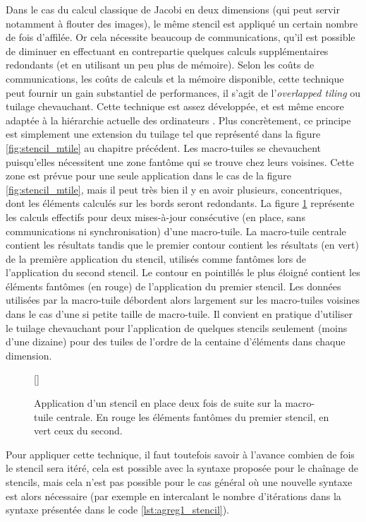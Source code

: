 Dans le cas du calcul classique de Jacobi en deux dimensions (qui peut servir notamment à flouter des images), le même stencil est appliqué un certain nombre de fois d'affilée. Or cela nécessite beaucoup de communications, qu'il est possible de diminuer en effectuant en contrepartie quelques calculs supplémentaires redondants (et en utilisant un peu plus de mémoire). Selon les coûts de communications, les coûts de calculs et la mémoire disponible, cette technique peut fournir un gain substantiel de performances, il s'agit de l'\emph{overlapped tiling} ou tuilage chevauchant. Cette technique est assez développée, et est même encore adaptée à la hiérarchie actuelle des ordinateurs \cite{Art17}. Plus concrètement, ce principe est simplement une extension du tuilage tel que représenté dans la figure \ref{fig:stencil_mtile} au chapitre précédent. Les macro-tuiles se chevauchent puisqu'elles nécessitent une zone fantôme qui se trouve chez leurs voisines. Cette zone est prévue pour une seule application dans le cas de la figure \ref{fig:stencil_mtile}, mais il peut très bien il y en avoir plusieurs, concentriques, dont les éléments calculés sur les bords seront redondants. La figure \ref{fig:stencil_mtile2} représente les calculs effectifs pour deux mises-à-jour consécutive (en place, sans communications ni synchronisation) d'une macro-tuile. La macro-tuile centrale contient les résultats tandis que le premier contour contient les résultats (en vert) de la première application du stencil, utilisés comme fantômes lors de l'application du second stencil. Le contour en pointillés le plus éloigné contient les éléments fantômes (en rouge) de l'application du premier stencil. Les données utilisées par la macro-tuile débordent alors largement sur les macro-tuiles voisines dans le cas d'une si petite taille de macro-tuile. Il convient en pratique d'utiliser le tuilage chevauchant pour l'application de quelques stencils seulement (moins d'une dizaine) pour des tuiles de l'ordre de la centaine d'éléments dans chaque dimension.

\begin{figure}[!h]
[\FBwidth]
{\caption{Application d'un stencil en place deux fois de suite sur la macro-tuile centrale. En rouge les éléments fantômes du premier stencil, en vert ceux du second.}\label{fig:stencil_mtile2}}
{}
\end{figure}

Pour appliquer cette technique, il faut toutefois savoir à l'avance combien de fois le stencil sera itéré, cela est possible avec la syntaxe proposée pour le chaînage de stencils, mais cela n'est pas possible pour le cas général où une nouvelle syntaxe est alors nécessaire (par exemple en intercalant le nombre d'itérations dans la syntaxe présentée dans le code \ref{lst:agreg1_stencil}). 

